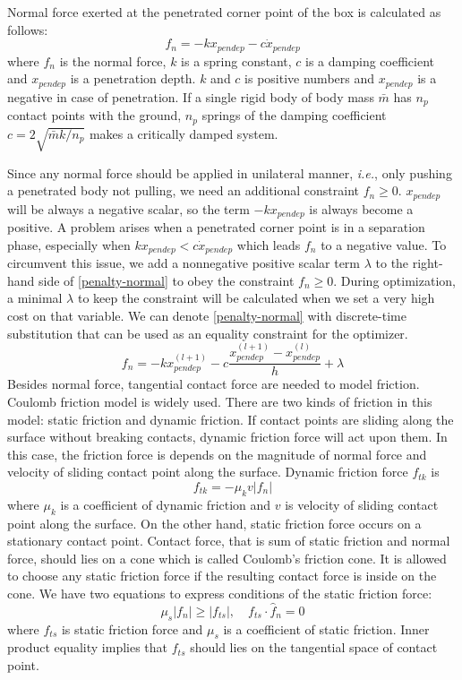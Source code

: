 \documentclass{acm_proc_article-sp}
\begin{document}
Normal force exerted at the penetrated corner point of the box is calculated as follows:
\begin{equation}\label{penalty-normal}
f_n = -k x_{pendep} - c \dot{x}_{pendep}
\end{equation}
where $f_n$ is the normal force, $k$ is a spring constant, $c$ is a damping coefficient and $x_{pendep}$ is
a penetration depth. $k$ and $c$ is positive numbers and $x_{pendep}$ is a negative in case of penetration.
If a single rigid body of body mass $\bar{m}$ has $n_p$ contact points with the ground,
$n_p$ springs of the damping coefficient $c=2\sqrt{\bar{m}k/n_p}$ makes a critically damped system.

Since any normal force should be applied in unilateral manner, \emph{i.e.},
only pushing a penetrated body not pulling, we need an additional constraint $f_n \geq 0$.
$x_{pendep}$ will be always a negative scalar, so the term $-kx_{pendep}$ is always become a positive.
A problem arises when a penetrated corner point is in a separation phase,
especially when $kx_{pendep} < c\dot{x}_{pendep}$ which leads $f_n$ to a negative value.
To circumvent this issue, we add a nonnegative positive scalar term $\lambda$ to the right-hand side
of \eqref{penalty-normal} to obey the constraint $f_n \geq 0$. During optimization,
a minimal $\lambda$ to keep the constraint will be calculated
when we set a very high cost on that variable. We can denote \eqref{penalty-normal} with
discrete-time substitution that can be used as an equality constraint for the optimizer.
\begin{equation}\label{penalty-normal-discretized}
f_n = -k x_{pendep}^{(l+1)} - c \frac{x_{pendep}^{(l+1)} - x_{pendep}^{(l)}}{h} + \lambda
\end{equation}
Besides normal force, tangential contact force are needed to model friction.
Coulomb friction model is widely used.
There are two kinds of friction in this model: static friction and dynamic friction.
If contact points are sliding along the surface without breaking contacts,
dynamic friction force will act upon them. In this case, the friction force is depends
on the magnitude of normal force and velocity of sliding contact point along the surface.
Dynamic friction force $f_{tk}$ is
\begin{equation}\label{dynamic-friction}
f_{tk} = -\mu_k v |f_n|
\end{equation}
where $\mu_k$ is a coefficient of dynamic friction
and $v$ is velocity of sliding contact point along the surface.
On the other hand, static friction force occurs on a stationary contact point.
Contact force, that is sum of static friction and normal force, should lies on a cone
which is called Coulomb's friction cone.
It is allowed to choose any static friction force if the resulting contact force is
inside on the cone. We have two equations to express conditions of the static friction force:
\begin{equation}\label{static-friction}
\mu_s |f_n| \geq |f_{ts}|, \quad f_{ts} \cdot \hat{f}_n = 0
\end{equation}
where $f_{ts}$ is static friction force and $\mu_s$ is a coefficient of static friction.
Inner product equality implies that $f_{ts}$ should lies on the tangential space of contact point.
\end{document}
